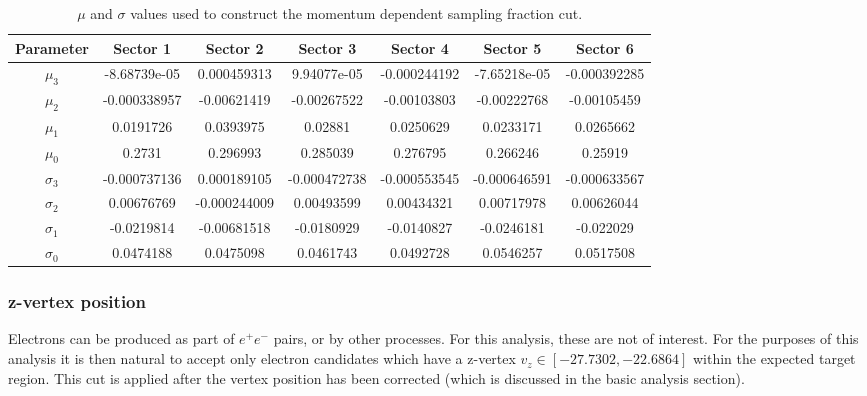 \begin{table}[h]
  \centering 

  \begin{tabular}{c | c | c | c | c | c | c}
    Parameter & Sector 1 & Sector 2 & Sector 3 & Sector 4 & Sector 5 & Sector 6                           \\
    \hline
    $\mu_3$     & -8.68739e-05 & 0.000459313  &  9.94077e-05 & -0.000244192 & -7.65218e-05 & -0.000392285  \\
    $\mu_2$     & -0.000338957 & -0.00621419  & -0.00267522  & -0.00103803  & -0.00222768  & -0.00105459   \\
    $\mu_1$     &  0.0191726   &  0.0393975   &  0.02881     &  0.0250629   &  0.0233171   &  0.0265662    \\
    $\mu_0$     &  0.2731      &  0.296993    &  0.285039    &  0.276795    &  0.266246    &  0.25919      \\
    $\sigma_3$  & -0.000737136 &  0.000189105 & -0.000472738 & -0.000553545 & -0.000646591 & -0.000633567  \\
    $\sigma_2$  &  0.00676769  & -0.000244009 &  0.00493599  &  0.00434321  &  0.00717978  &  0.00626044   \\
    $\sigma_1$  & -0.0219814   & -0.00681518  & -0.0180929   & -0.0140827   & -0.0246181   & -0.022029     \\
    $\sigma_0$  &  0.0474188   &  0.0475098   &  0.0461743   &  0.0492728   &  0.0546257   &  0.0517508    
  \end{tabular}
  \caption{$\mu$ and $\sigma$ values used to construct the momentum dependent sampling fraction cut.}
  \label{table-sampling-fraction}
\end{table}

\subsubsection*{z-vertex position}
Electrons can be produced as part of $e^+ e^-$ pairs, or by other processes.  For this analysis, these are not of interest.  For the purposes of this analysis it is then natural to accept only electron candidates which have a z-vertex $v_z \in [-27.7302, -22.6864]$ within the expected target region.  This cut is applied after the vertex position has been corrected (which is discussed in the basic analysis section).


